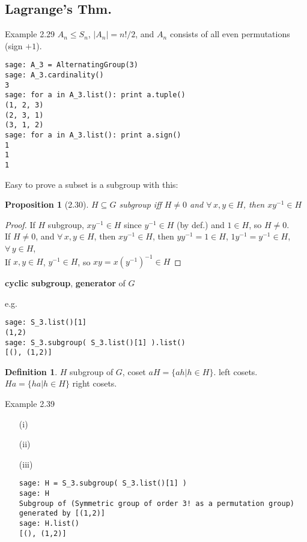 \documentclass[twoside,landscape]{amsart}
\theoremstyle{plain}
\newtheorem{proposition}{Proposition}
\theoremstyle{definition}
\newtheorem{definition}{Definition}
\theoremstyle{remark}
\begin{document}
\begin{multicols*}{2}
\subsection{Lagrange's Thm. }

Example 2.29 $A_n \leq S_n$, $|A_n|=n!/2$, and $A_n$ consists of all even permutations (sign $+1$).
\begin{lstlisting}
sage: A_3 = AlternatingGroup(3)
sage: A_3.cardinality()
3
sage: for a in A_3.list(): print a.tuple()
(1, 2, 3)
(2, 3, 1)
(3, 1, 2)
sage: for a in A_3.list(): print a.sign()
1
1
1
\end{lstlisting} 

Easy to prove a subset is a subgroup with this:
\begin{proposition}[2.30]
$ H \subseteq G$ subgroup iff $H \neq 0$ and $\forall \, x,y \in H$, then $xy^{-1}\in H$
\end{proposition}
\begin{proof}
  If $H$ subgroup, $xy^{-1} \in H$ since $y^{-1} \in H$ (by def.) and $1 \in H$, so $H \neq 0$.  \\
If $H \neq 0$, and $\forall \, x ,y \in H$, then $xy^{-1} \in H$, then $yy^{-1} = 1 \in H$, $1y^{-1} = y^{-1} \in H$, \, $\forall \, y \in H$,  \\
If $x,y \in H$, $y^{-1} \in H$, so $xy = x(y^{-1})^{-1} \in H$
\end{proof}

\textbf{cyclic subgroup}, \textbf{generator} of $G$

e.g.
\begin{lstlisting}
sage: S_3.list()[1]
(1,2)
sage: S_3.subgroup( S_3.list()[1] ).list()
[(), (1,2)]
\end{lstlisting}

\begin{definition}
  $H$ subgroup of $G$, coset $aH = \lbrace ah  | h \in H \rbrace$.  left cosets.  \\
$Ha = \lbrace ha | h \in H \rbrace$ right cosets.  
\end{definition}

Example 2.39
\begin{enumerate}
\item[(i)]
\item[(ii)]
\item[(iii)]
\begin{lstlisting}
sage: H = S_3.subgroup( S_3.list()[1] )
sage: H
Subgroup of (Symmetric group of order 3! as a permutation group) generated by [(1,2)]
sage: H.list()
[(), (1,2)]
\end{lstlisting}


\end{enumerate}
\end{multicols*}
\end{document}

